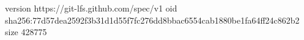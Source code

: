 version https://git-lfs.github.com/spec/v1
oid sha256:77d57dea2592f3b31d1d55f7fc276dd8bbac6554cab1880be1fa64ff24c862b2
size 428775

